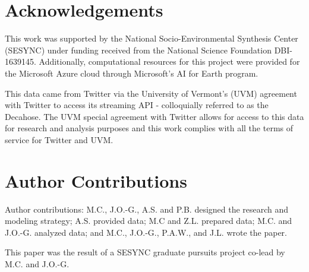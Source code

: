 \documentclass[fleqn,10pt]{wlscirep}
\begin{document}
\section*{Acknowledgements}
This work was supported by the National Socio-Environmental Synthesis Center (SESYNC) under funding received from the National Science Foundation DBI-1639145. Additionally, computational resources for this project were provided for the Microsoft Azure cloud through Microsoft's AI for Earth program.

This data came from Twitter via the University of Vermont’s (UVM) agreement with Twitter to access its streaming API - colloquially referred to as the Decahose. The UVM special agreement with Twitter allows for access to this data for research and analysis purposes and this work complies with all the terms of service for Twitter and UVM. 



\section*{Author Contributions}
Author contributions: M.C., J.O.-G., A.S. and P.B. designed the research and modeling strategy; A.S. provided data; M.C and Z.L. prepared data; M.C. and J.O.-G. analyzed data; and M.C., J.O.-G., P.A.W., and J.L. wrote the paper.

\noindent This paper was the result of a SESYNC graduate pursuits project co-lead by M.C. and J.O.-G.
\end{document}
